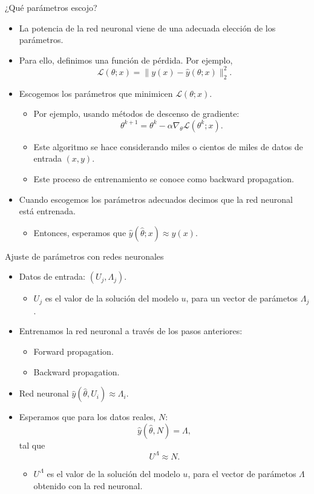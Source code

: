 \documentclass[
  unknownkeysallowed %
]{beamer}
\begin{document}
\begin{frame}{¿Qué parámetros escojo?}
  \begin{itemize}
    \item La potencia de la red neuronal viene de una adecuada elección de los parámetros.
    \item Para ello, definimos una función de pérdida. Por ejemplo,
    $$
    \mathcal{L}(\theta;x)=\|y(x)-\hat y(\theta;x)\|_2^2.
    $$
    \item Escogemos los parámetros que minimicen $\mathcal{L}(\theta;x)$.
    \begin{itemize}
      \item Por ejemplo, usando métodos de descenso de gradiente:
      $$
        \theta^{k+1} = \theta^k - \alpha\nabla_\theta \mathcal{L}(\theta^k;x).
      $$
      \item Este algoritmo se hace considerando miles o cientos de miles de datos de entrada $(x,y)$.
      \item Este proceso de entrenamiento se conoce como backward propagation.
    \end{itemize}
    \item Cuando escogemos los parámetros adecuados decimos que la red neuronal está entrenada.
    \begin{itemize}
      \item Entonces, esperamos que $\hat y(\hat \theta;x)\approx y(x)$.
    \end{itemize}
  \end{itemize}
\end{frame}

\begin{frame}{Ajuste de parámetros con redes neuronales}
  \begin{itemize}
    \item Datos de entrada: $(U_j,\Lambda_j)$.
    \begin{itemize}
      \item $U_j$ es el valor de la solución del modelo $u$, para un vector de parámetos $\Lambda_j$.
    \end{itemize}
    \item Entrenamos la red neuronal a través de los pasos anteriores:
    \begin{itemize}
      \item Forward propagation.
      \item Backward propagation.
    \end{itemize}
    \item Red neuronal $\hat y(\hat \theta,U_i)\approx \Lambda_i$.
    \item Esperamos que para los datos reales, $N$:
    $$
    \hat y(\hat \theta,N)= \Lambda,
    $$
    tal que
    $$
    U^\Lambda\approx N.
    $$
    \begin{itemize}
      \item $U^\Lambda$ es el valor de la solución del modelo $u$, para el vector de parámetos $\Lambda$ obtenido con la red neuronal.
    \end{itemize}
  \end{itemize}
\end{frame}
\end{document}
